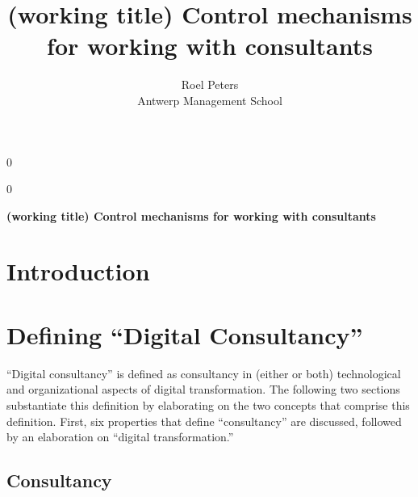 \documentclass[12pt]{article}
\newcommand{\blind}{0}
\begin{document}
\def\spacingset#1{\renewcommand{\baselinestretch}%
{#1}\small\normalsize} \spacingset{1}



\blind
{
  \title{\bf (working title) Control mechanisms for working with
consultants}

  \author{
        Roel Peters \\
    Antwerp Management School\\
      }
  \maketitle
} \fi

\blind
{
  \bigskip
  \bigskip
  \bigskip
  \begin{center}
    {\LARGE\bf (working title) Control mechanisms for working with
consultants}
  \end{center}
  \medskip
} \fi

\bigskip

\noindent%
 

\vfill

\newpage
\spacingset{1.9} %

\section{Introduction}\label{introduction}

\section{Defining ``Digital
Consultancy''}\label{defining-digital-consultancy}

``Digital consultancy'' is defined as consultancy in (either or both)
technological and organizational aspects of digital transformation. The
following two sections substantiate this definition by elaborating on
the two concepts that comprise this definition. First, six properties
that define ``consultancy'' are discussed, followed by an elaboration on
``digital transformation.''

\subsection{Consultancy}\label{consultancy}
\end{document}
